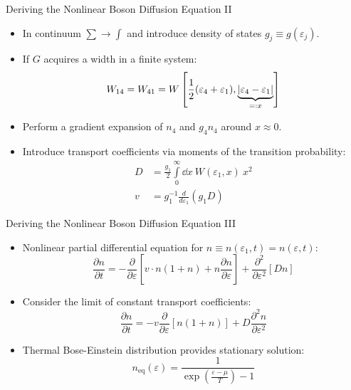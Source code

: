 \begin{frame}{Deriving the Nonlinear Boson Diffusion Equation II}
\begin{itemize}
	\item In continuum $\sum\rightarrow\int$ and introduce \alert{density of states} $g_j \equiv g(\varepsilon_j)$.
	\item If $G$ acquires a width in a finite system: 
	\begin{equation}
		W_{14}=W_{41}=W\left[\frac{1}{2}(\varepsilon_4+\varepsilon_1),\underbrace{\abs{\varepsilon_4-\varepsilon_1}}_{=: x}\right]
	\end{equation}
	\item Perform a \alert{gradient expansion} of $n_4$ and $g_4n_4$ around $x\approx 0$.
	\item Introduce \alert{transport coefficients} via moments of the transition probability:
\begin{align}
	D &= \frac{g_1}{2}\int\limits_0^{\infty}\dd x\ W(\varepsilon_1,x) \ x^2 \\
	v &= g_1^{-1}\frac{d}{d\varepsilon_1}(g_1D) 
\end{align}
\end{itemize}
\end{frame}


\begin{frame}{Deriving the Nonlinear Boson Diffusion Equation III}
\begin{itemize}
	\item Nonlinear partial differential equation for $n \equiv n(\varepsilon_1,t) = n(\varepsilon,t)$:
		\begin{equation}
			\frac{\partial n}{\partial t} = -\frac{\partial}{\partial\varepsilon}\left[v\cdot n(1+n) + n\frac{\partial n}{\partial\varepsilon}\right] + \frac{\partial^2}{\partial\varepsilon^2}\left[Dn\right]\label{eqn:nbde1}
		\end{equation}

	\item Consider the limit of constant transport coefficients:
		\begin{equation}
			\frac{\partial n}{\partial t} = -v\frac{\partial}{\partial\varepsilon}\left[n(1+n)\right] + D\frac{\partial^2 n}{\partial\varepsilon^2}\label{eqn:nbde2}
		\end{equation}

\item Thermal \alert{Bose-Einstein distribution} provides stationary solution:
\begin{equation}
	n_{\mathrm{eq}}(\varepsilon) = \frac{1}{\exp(\frac{\varepsilon-\mu}{T}) - 1}
\end{equation}
\end{itemize}
\end{frame}

